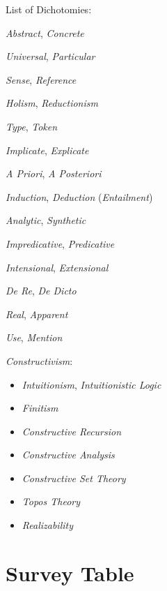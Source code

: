 List of Dichotomies:

\emph{Abstract}, \emph{Concrete}

\emph{Universal}, \emph{Particular}

\emph{Sense}, \emph{Reference}

\emph{Holism}, \emph{Reductionism}

\emph{Type}, \emph{Token}

\emph{Implicate}, \emph{Explicate}

\emph{A Priori}, \emph{A Posteriori}

\emph{Induction}, \emph{Deduction} (\emph{Entailment})

\emph{Analytic}, \emph{Synthetic}

\emph{Impredicative}, \emph{Predicative}

\emph{Intensional}, \emph{Extensional}

\emph{De Re}, \emph{De Dicto}

\emph{Real}, \emph{Apparent}

\emph{Use}, \emph{Mention}

\emph{Constructivism}:
\begin{itemize}
    \item \emph{Intuitionism}, \emph{Intuitionistic Logic}
    \item \emph{Finitism}
    \item \emph{Constructive Recursion}
    \item \emph{Constructive Analysis}
    \item \emph{Constructive Set Theory}
    \item \emph{Topos Theory}
    \item \emph{Realizability}
\end{itemize}



\section{Survey Table}


